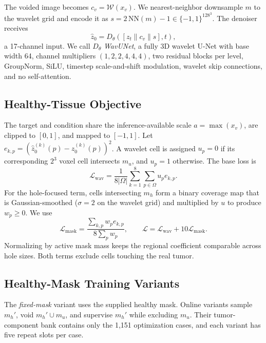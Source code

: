 The voided image becomes $c_v=\mathcal W(x_v)$. We nearest-neighbor downsample $m$
to the wavelet grid and encode it as
$s=2\,\mathrm{NN}(m)-1\in\{-1,1\}^{128^3}$. The denoiser receives
\begin{equation}
\hat z_0=D_\theta([z_t\|c_v\|s],t),
\end{equation}
a 17-channel input. We call $D_\theta$ \emph{WavUNet}, a fully 3D wavelet U-Net
\cite{ronneberger2015unet,friedrich2024wdm} with base width 64, channel multipliers
$(1,2,2,4,4,4)$, two residual blocks per level, GroupNorm, SiLU, timestep
scale-and-shift modulation, wavelet skip connections, and no self-attention.

\subsection{Healthy-Tissue Objective}
\label{sec:method:objective}

The target and condition share the inference-available scale
$a=\max(x_v)$, are clipped to $[0,1]$, and mapped to $[-1,1]$. Let
$e_{k,p}=(\hat z_0^{(k)}(p)-z_0^{(k)}(p))^2$. A wavelet cell is assigned
$u_p=0$ if its corresponding $2^3$ voxel cell intersects $m_u$, and $u_p=1$
otherwise. The base loss is
\begin{equation}
\mathcal L_{\mathrm{wav}}=
\frac{1}{8|\Omega|}\sum_{k=1}^{8}\sum_{p\in\Omega}u_p e_{k,p}.
\end{equation}
For the hole-focused term, cells intersecting $m_h$ form a binary coverage map that
is Gaussian-smoothed ($\sigma=2$ on the wavelet grid) and multiplied by $u$ to
produce $w_p\ge0$. We use
\begin{equation}
\mathcal L_{\mathrm{mask}}=
\frac{\sum_{k,p}w_p e_{k,p}}{8\sum_p w_p},
\qquad
\mathcal L=\mathcal L_{\mathrm{wav}}+10\mathcal L_{\mathrm{mask}}.
\end{equation}
Normalizing by active mask mass keeps the regional coefficient comparable across
hole sizes. Both terms exclude cells touching the real tumor.

\subsection{Healthy-Mask Training Variants}
\label{sec:method:augmentation}

The \emph{fixed-mask} variant uses the supplied healthy mask. Online variants
sample $m_h'$, void $m_h'\cup m_u$, and supervise $m_h'$ while excluding $m_u$.
Their tumor-component bank contains only the 1,151 optimization cases, and each
variant has five repeat slots per case.

